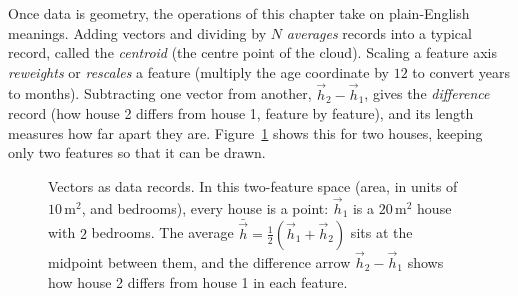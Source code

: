 Once data is geometry, the operations of this chapter take on plain-English meanings.
Adding vectors and dividing by $N$ \emph{averages} records into a typical record, called
the \emph{centroid} (the centre point of the cloud).
Scaling a feature axis \emph{reweights} or \emph{rescales} a feature (multiply the age
coordinate by $12$ to convert years to months). Subtracting one vector from another,
$\vec{h}_2 - \vec{h}_1$, gives the \emph{difference} record (how house 2 differs from
house 1, feature by feature), and its length measures how far apart they are.
Figure~\ref{ch02:fig-data-features} shows this for two houses, keeping only two features
so that it can be drawn.

\begin{figure}[H]
\centering
{}
\caption{Vectors as data records. In this two-feature space (area, in units of
$10\,\text{m}^2$, and bedrooms), every house is a point: $\vec{h}_1$ is a
$20\,\text{m}^2$ house with $2$ bedrooms. The average $\bar{\vec{h}}=\tfrac12(\vec{h}_1+\vec{h}_2)$
sits at the midpoint between them, and the difference arrow $\vec{h}_2-\vec{h}_1$ shows
how house 2 differs from house 1 in each feature.}
\label{ch02:fig-data-features}
\end{figure}

